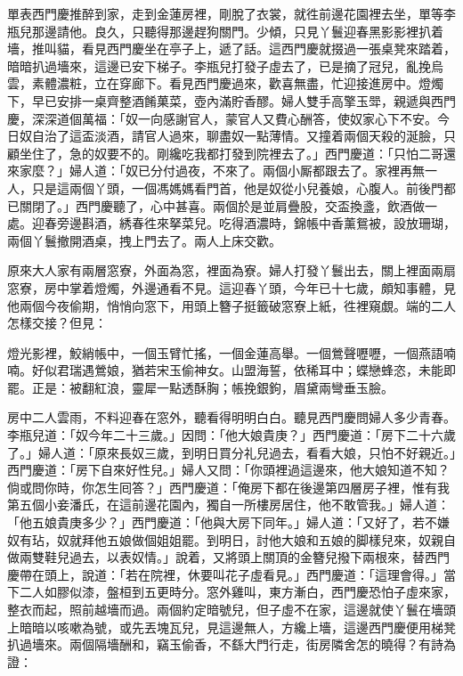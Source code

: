 單表西門慶推醉到家，走到金蓮房裡，剛脫了衣裳，就徃前邊花園裡去坐，單等李瓶兒那邊請他。良久，只聽得那邊趕狗關門。{}少傾，只見丫鬟迎春黑影影裡扒着墻，推叫貓，{}看見西門慶坐在亭子上，遞了話。這西門慶就掇過一張桌凳來踏着，暗暗扒過墻來，這邊已安下梯子。李瓶兒打發子虛去了，已是摘了冠兒，亂挽烏雲，素體濃粧，立在穿廊下。{}看見西門慶過來，歡喜無盡，忙迎接進房中。燈燭下，早已安排一桌齊整酒餚菓菜，壺內滿貯香醪。婦人雙手高擎玉斝，親遞與西門慶，深深道個萬福：「奴一向感謝官人，蒙官人又費心酬答，使奴家心下不安。今日奴自治了這盃淡酒，請官人過來，聊盡奴一點薄情。{}又撞着兩個天殺的涎臉，只顧坐住了，急的奴要不的。剛纔吃我都打發到院裡去了。」西門慶道：「只怕二哥還來家麼？」婦人道：「奴已分付過夜，不來了。兩個小厮都跟去了。家裡再無一人，只是這兩個丫頭，一個馮媽媽看門首，他是奴從小兒養娘，心腹人。前後門都已關閉了。」西門慶聽了，心中甚喜。兩個於是並肩疊股，交盃換盞，飲酒做一處。迎春旁邊斟酒，綉春徃來拏菜兒。吃得酒濃時，錦帳中香薰鴛被，設放珊瑚，兩個丫鬟撤開酒桌，拽上門去了。兩人上床交歡。

原來大人家有兩層窓寮，外面為窓，裡面為寮。婦人打發丫鬟出去，關上裡面兩扇窓寮，房中掌着燈燭，外邊通看不見。這迎春丫頭，今年已十七歲，頗知事體，見他兩個今夜偷期，悄悄向窓下，用頭上簪子挺籤破窓寮上紙，徃裡窺覷。端的二人怎樣交接？但見：

燈光影裡，鮫綃帳中，一個玉臂忙搖，一個金蓮高舉。一個鶯聲嚦嚦，一個燕語喃喃。好似君瑞遇鶯娘，猶若宋玉偷神女。山盟海誓，依稀耳中；蝶戀蜂恣，未能即罷。正是：被翻紅浪，靈犀一點透酥胸；帳挽銀鉤，眉黛兩彎垂玉臉。

房中二人雲雨，不料迎春在窓外，聽看得明明白白。聽見西門慶問婦人多少青春。李瓶兒道：「奴今年二十三歲。」因問：「他大娘貴庚？」西門慶道：「房下二十六歲了。」婦人道：「原來長奴三歲，到明日買分礼兒過去，看看大娘，只怕不好親近。」{}西門慶道：「房下自來好性兒。」婦人又問：「你頭裡過這邊來，他大娘知道不知？倘或問你時，你怎生囘答？」西門慶道：「俺房下都在後邊第四層房子裡，惟有我第五個小妾潘氏，在這前邊花園內，獨自一所樓房居住，他不敢管我。」婦人道：「他五娘貴庚多少？」西門慶道：「他與大房下同年。」婦人道：「又好了，若不嫌奴有玷，奴就拜他五娘做個姐姐罷。到明日，討他大娘和五娘的脚樣兒來，奴親自做兩雙鞋兒過去，以表奴情。」說着，又將頭上關頂的金簪兒撥下兩根來，替西門慶帶在頭上，說道：「若在院裡，休要叫花子虛看見。」西門慶道：「這理會得。」當下二人如膠似漆，盤桓到五更時分。窓外雞叫，東方漸白，西門慶恐怕子虛來家，整衣而起，照前越墻而過。兩個約定暗號兒，但子虛不在家，這邊就使丫鬟在墻頭上暗暗以咳嗽為號，或先丟塊瓦兒，見這邊無人，方纔上墻，這邊西門慶便用梯凳扒過墻來。兩個隔墻酬和，竊玉偷香，不繇大門行走，街房隣舍怎的曉得？有詩為證：


